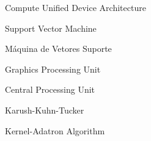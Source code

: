\item [CUDA] Compute Unified Device Architecture
\item [SVM] Support Vector Machine
\item [MVS] Máquina de Vetores Suporte
\item [GPU] Graphics Processing Unit
\item [CPU] Central Processing Unit
\item [KTT] Karush-Kuhn-Tucker
\item [KAA] Kernel-Adatron Algorithm